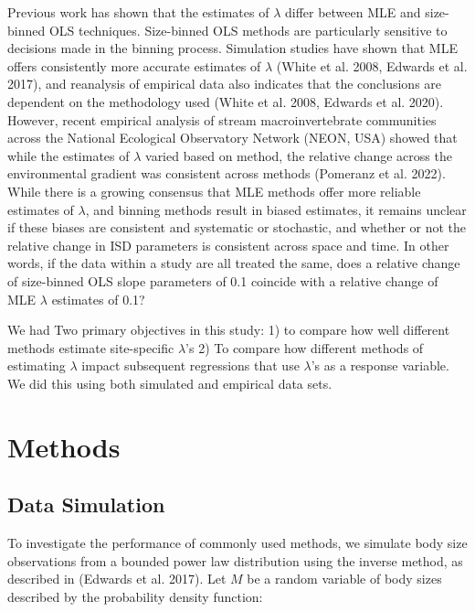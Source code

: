 \documentclass[
]{article}
\begin{document}
Previous work has shown that the estimates of \(\lambda\) differ between
MLE and size-binned OLS techniques. Size-binned OLS methods are
particularly sensitive to decisions made in the binning process.
Simulation studies have shown that MLE offers consistently more accurate
estimates of \(\lambda\) (White et al. 2008, Edwards et al. 2017), and
reanalysis of empirical data also indicates that the conclusions are
dependent on the methodology used (White et al. 2008, Edwards et al.
2020). However, recent empirical analysis of stream macroinvertebrate
communities across the National Ecological Observatory Network (NEON,
USA) showed that while the estimates of \(\lambda\) varied based on
method, the relative change across the environmental gradient was
consistent across methods (Pomeranz et al. 2022). While there is a
growing consensus that MLE methods offer more reliable estimates of
\(\lambda\), and binning methods result in biased estimates, it remains
unclear if these biases are consistent and systematic or stochastic, and
whether or not the relative change in ISD parameters is consistent
across space and time. In other words, if the data within a study are
all treated the same, does a relative change of size-binned OLS slope
parameters of 0.1 coincide with a relative change of MLE \(\lambda\)
estimates of 0.1?

We had Two primary objectives in this study: 1) to compare how well
different methods estimate site-specific \(\lambda\)'s 2) To compare how
different methods of estimating \(\lambda\) impact subsequent
regressions that use \(\lambda\)'s as a response variable. We did this
using both simulated and empirical data sets.

\hypertarget{methods}{%
\section{Methods}\label{methods}}

\hypertarget{data-simulation}{%
\subsection{Data Simulation}\label{data-simulation}}

To investigate the performance of commonly used methods, we simulate
body size observations from a bounded power law distribution using the
inverse method, as described in (Edwards et al. 2017). Let \(M\) be a
random variable of body sizes described by the probability density
function:
\end{document}
